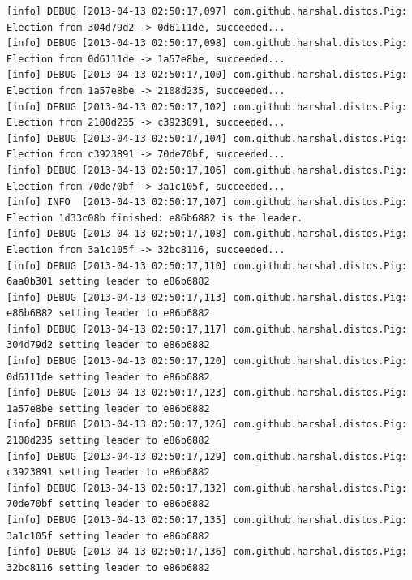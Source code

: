\documentclass[]{article}
\begin{document}
\begin{verbatim}
[info] DEBUG [2013-04-13 02:50:17,097] com.github.harshal.distos.Pig: Election from 304d79d2 -> 0d6111de, succeeded...
[info] DEBUG [2013-04-13 02:50:17,098] com.github.harshal.distos.Pig: Election from 0d6111de -> 1a57e8be, succeeded...
[info] DEBUG [2013-04-13 02:50:17,100] com.github.harshal.distos.Pig: Election from 1a57e8be -> 2108d235, succeeded...
[info] DEBUG [2013-04-13 02:50:17,102] com.github.harshal.distos.Pig: Election from 2108d235 -> c3923891, succeeded...
[info] DEBUG [2013-04-13 02:50:17,104] com.github.harshal.distos.Pig: Election from c3923891 -> 70de70bf, succeeded...
[info] DEBUG [2013-04-13 02:50:17,106] com.github.harshal.distos.Pig: Election from 70de70bf -> 3a1c105f, succeeded...
[info] INFO  [2013-04-13 02:50:17,107] com.github.harshal.distos.Pig: Election 1d33c08b finished: e86b6882 is the leader.
[info] DEBUG [2013-04-13 02:50:17,108] com.github.harshal.distos.Pig: Election from 3a1c105f -> 32bc8116, succeeded...
[info] DEBUG [2013-04-13 02:50:17,110] com.github.harshal.distos.Pig: 6aa0b301 setting leader to e86b6882
[info] DEBUG [2013-04-13 02:50:17,113] com.github.harshal.distos.Pig: e86b6882 setting leader to e86b6882
[info] DEBUG [2013-04-13 02:50:17,117] com.github.harshal.distos.Pig: 304d79d2 setting leader to e86b6882
[info] DEBUG [2013-04-13 02:50:17,120] com.github.harshal.distos.Pig: 0d6111de setting leader to e86b6882
[info] DEBUG [2013-04-13 02:50:17,123] com.github.harshal.distos.Pig: 1a57e8be setting leader to e86b6882
[info] DEBUG [2013-04-13 02:50:17,126] com.github.harshal.distos.Pig: 2108d235 setting leader to e86b6882
[info] DEBUG [2013-04-13 02:50:17,129] com.github.harshal.distos.Pig: c3923891 setting leader to e86b6882
[info] DEBUG [2013-04-13 02:50:17,132] com.github.harshal.distos.Pig: 70de70bf setting leader to e86b6882
[info] DEBUG [2013-04-13 02:50:17,135] com.github.harshal.distos.Pig: 3a1c105f setting leader to e86b6882
[info] DEBUG [2013-04-13 02:50:17,136] com.github.harshal.distos.Pig: 32bc8116 setting leader to e86b6882
\end{verbatim}
\normalsize
\end{document}
